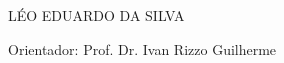   \begin{capa}
	\begin{center}
		\Large\imprimirinstituicao
	\end{center}
	
	\begin{center}
		\vspace*{2.6cm}
		\Large LÉO EDUARDO DA SILVA
		\vspace*{1.5cm}
		
		\Large \textbf{\imprimirtitulo}
		
		\vspace*{2.4cm}
		
		\noindent Orientador: Prof. Dr. Ivan Rizzo Guilherme
		
		\vspace*{2.4cm}
		
		{\large\imprimirlocal}
		\par
		{\large\imprimirdata}
		\vspace*{1cm}
	\end{center}
\end{capa}